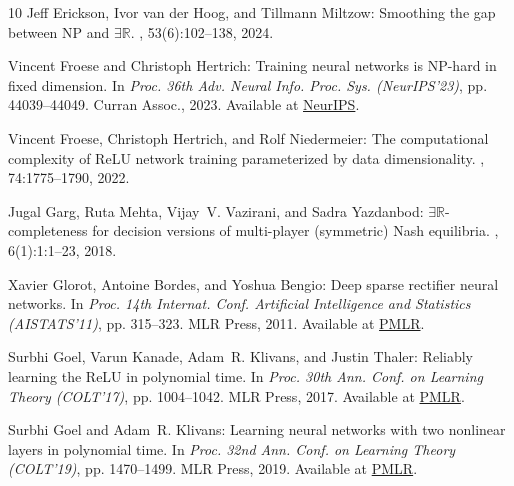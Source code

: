 \begin{thebibliography}{10}
{\sc Jeff Erickson, Ivor {van der Hoog}, and Tillmann Miltzow}: Smoothing the
  gap between {NP} and $\exists\mathbb{R}$.
, 53(6):102--138, 2024.
\newblock [\epfmtdoi{10.1137/20M1385287}]

{\sc Vincent Froese and Christoph Hertrich}: Training neural networks is
  {NP}-hard in fixed dimension.
\newblock In {\em Proc. 36th Adv. Neural Info. Proc. Sys. (NeurIPS'23)}, pp.
  44039--44049. Curran Assoc., 2023.
\newblock Available at
  \href{https://papers.nips.cc/paper_files/paper/2023/hash/8948a8d039ed52d1031db6c7c2373378-Abstract-Conference.html}{NeurIPS}.

{\sc Vincent Froese, Christoph Hertrich, and Rolf Niedermeier}: The
  computational complexity of {ReLU} network training parameterized by data
  dimensionality.
, 74:1775--1790, 2022.

{\sc Jugal Garg, Ruta Mehta, Vijay~V. Vazirani, and Sadra Yazdanbod}:
  $\exists\mathbb{R}$-completeness for decision versions of multi-player
  (symmetric) {N}ash equilibria.
, 6(1):1:1--23, 2018.
\newblock [\epfmtdoi{10.1145/3175494}]

{\sc Xavier Glorot, Antoine Bordes, and Yoshua Bengio}: Deep sparse rectifier
  neural networks.
\newblock In {\em Proc. 14th Internat. Conf. Artificial Intelligence and
  Statistics (AISTATS'11)}, pp. 315--323. MLR Press, 2011.
\newblock Available at
  \href{https://proceedings.mlr.press/v15/glorot11a}{PMLR}.

{\sc Surbhi Goel, Varun Kanade, Adam~R. Klivans, and Justin Thaler}: Reliably
  learning the {ReLU} in polynomial time.
\newblock In {\em Proc. 30th Ann. Conf. on Learning Theory (COLT'17)}, pp.
  1004--1042. MLR Press, 2017.
\newblock Available at
  \href{https://proceedings.mlr.press/v65/goel17a.html}{PMLR}.

{\sc Surbhi Goel and Adam~R. Klivans}: Learning neural networks with two
  nonlinear layers in polynomial time.
\newblock In {\em Proc. 32nd Ann. Conf. on Learning Theory (COLT'19)}, pp.
  1470--1499. MLR Press, 2019.
\newblock Available at
  \href{https://proceedings.mlr.press/v99/goel19b.html}{PMLR}.


\end{thebibliography}
